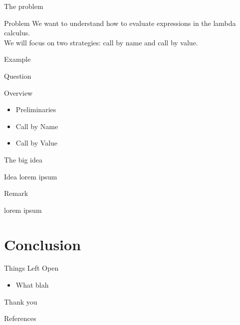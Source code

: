 \documentclass[10pt]{beamer}
\begin{document}
\begin{frame}[fragile]{The problem}
  \begin{alertblock}{Problem}
    We want to understand how to evaluate expressions in the lambda calculus.\\
    We will focus on two strategies: call by name and call by value.\\
  \end{alertblock}

  \pause

  \begin{alertblock}{Example}

  \end{alertblock}

  \begin{alertblock}{Question}

  \end{alertblock}
\end{frame}



\begin{frame}[fragile]{Overview}
  \begin{itemize}
    \item Preliminaries
    \item Call by Name
    \item Call by Value
  \end{itemize}
\end{frame}




\begin{frame}[fragile]{The big idea}

  \begin{alertblock}{Idea}
    lorem ipsum
  \end{alertblock}

  \pause

  \begin{alertblock}{Remark}

    lorem ipsum
  \end{alertblock}

\end{frame}



\section{Conclusion}


\begin{frame}[fragile]{Things Left Open}
  \begin{itemize}[<+- | alert@+>]
    \item What blah
  \end{itemize}
\end{frame}



\begin{frame}[standout]
  Thank you
\end{frame}

\begin{frame}[allowframebreaks]{References}
  
  
\end{frame}
\end{document}
